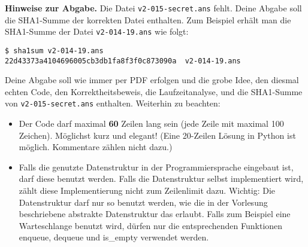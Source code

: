 \documentclass{uebung_cs}
\begin{document}
\textbf{Hinweise zur Abgabe.}
Die Datei \texttt{v2-015-secret.ans} fehlt. Deine Abgabe soll die
SHA1-Summe der korrekten Datei enthalten. Zum Beispiel erhält man die SHA1-Summe der Datei \texttt{v2-014-19.ans} wie folgt:
\begin{verbatim}
$ sha1sum v2-014-19.ans 
22d43373a4104696005cb3db1fa8f3f0c873090a  v2-014-19.ans
\end{verbatim}
Deine Abgabe soll wie immer per PDF erfolgen und die grobe Idee, den diesmal echten Code, den Korrektheitsbeweis, die Laufzeitanalyse, und die SHA1-Summe von \texttt{v2-015-secret.ans} enthalten.
Weiterhin zu beachten:
\begin{itemize}
\item Der Code darf maximal \textbf{60} Zeilen lang sein (jede Zeile mit maximal 100 Zeichen). Möglichst kurz und elegant! (Eine 20-Zeilen Lösung in Python ist möglich. Kommentare zählen nicht dazu.)
\item Falls die genutzte Datenstruktur in der Programmiersprache eingebaut ist, darf diese benutzt werden. Falls die Datenstruktur selbst implementiert wird, zählt diese Implementierung nicht zum Zeilenlimit dazu. Wichtig: Die Datenstruktur darf nur so benutzt werden, wie die in der Vorlesung beschriebene abstrakte Datenstruktur das erlaubt. Falls zum Beispiel eine Warteschlange benutzt wird, dürfen nur die entsprechenden Funktionen enqueue, dequeue und is\_empty verwendet werden.
\end{itemize}
\end{document}
